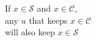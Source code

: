 \documentclass[preview]{standalone}
\begin{document}
\begin{center}
If $x \in \mathcal{S}$ and $ x \in \mathcal{C}$,\\any $u$ that keeps $x \in \mathcal{C}$\\will also keep $x \in \mathcal{S}$
\end{center}
\end{document}
